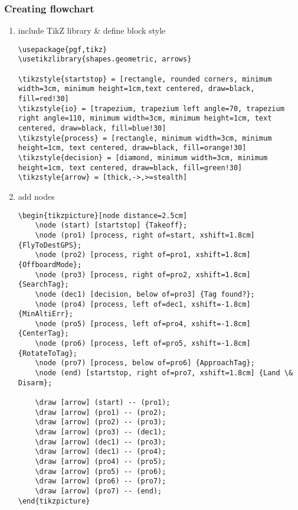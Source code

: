 \subsubsection{Creating flowchart}
\label{subsub:flowchart}

\begin{enumerate}
    \item include TikZ library \& define block style
    
\begin{lstlisting}[language=Tex]
\usepackage{pgf,tikz}
\usetikzlibrary{shapes.geometric, arrows}

\tikzstyle{startstop} = [rectangle, rounded corners, minimum width=3cm, minimum height=1cm,text centered, draw=black, fill=red!30]
\tikzstyle{io} = [trapezium, trapezium left angle=70, trapezium right angle=110, minimum width=3cm, minimum height=1cm, text centered, draw=black, fill=blue!30]
\tikzstyle{process} = [rectangle, minimum width=3cm, minimum height=1cm, text centered, draw=black, fill=orange!30]
\tikzstyle{decision} = [diamond, minimum width=3cm, minimum height=1cm, text centered, draw=black, fill=green!30]
\tikzstyle{arrow} = [thick,->,>=stealth]
\end{lstlisting}

\item add nodes

\begin{lstlisting}[language=Tex]
\begin{tikzpicture}[node distance=2.5cm]
    \node (start) [startstop] {Takeoff};
    \node (pro1) [process, right of=start, xshift=1.8cm] {FlyToDestGPS};
    \node (pro2) [process, right of=pro1, xshift=1.8cm] {OffboardMode};
    \node (pro3) [process, right of=pro2, xshift=1.8cm] {SearchTag};
    \node (dec1) [decision, below of=pro3] {Tag found?};
    \node (pro4) [process, left of=dec1, xshift=-1.8cm] {MinAltiErr};
    \node (pro5) [process, left of=pro4, xshift=-1.8cm] {CenterTag};
    \node (pro6) [process, left of=pro5, xshift=-1.8cm] {RotateToTag};
    \node (pro7) [process, below of=pro6] {ApproachTag};
    \node (end) [startstop, right of=pro7, xshift=1.8cm] {Land \& Disarm};
    
    \draw [arrow] (start) -- (pro1);
    \draw [arrow] (pro1) -- (pro2);
    \draw [arrow] (pro2) -- (pro3);
    \draw [arrow] (pro3) -- (dec1);
    \draw [arrow] (dec1) -- (pro3);
    \draw [arrow] (dec1) -- (pro4);
    \draw [arrow] (pro4) -- (pro5);
    \draw [arrow] (pro5) -- (pro6);
    \draw [arrow] (pro6) -- (pro7);
    \draw [arrow] (pro7) -- (end);
\end{tikzpicture}


\end{lstlisting}
\end{enumerate}
